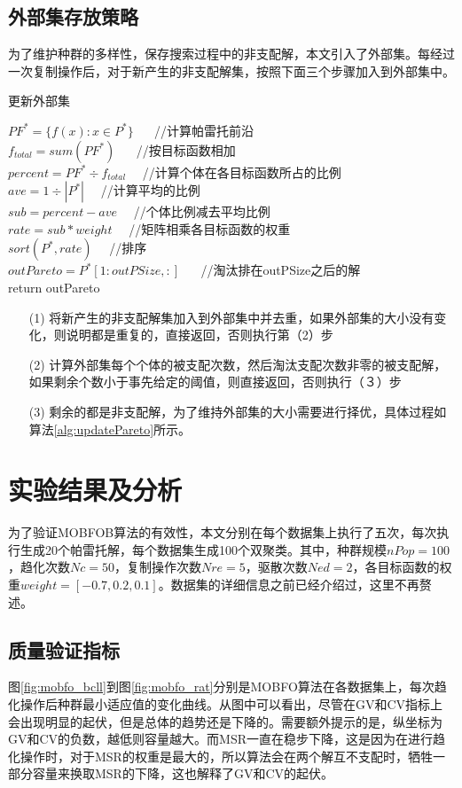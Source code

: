     \subsection{外部集存放策略}
    为了维护种群的多样性，保存搜索过程中的非支配解，本文引入了外部集。每经过一次复制操作后，对于新产生的非支配解集，按照下面三个步骤加入到外部集中。
    \begin{algorithm}[htbp]
        \caption{更新外部集} \label{alg:updatePareto}
        $PF^*= \{f(x):x\in P^*\}$ 　 //计算帕雷托前沿 \\
        $f_{total} = sum(PF^*)$  　 //按目标函数相加\\
        $percent = PF^* \div　f_{total} $　 //计算个体在各目标函数所占的比例\\
        $ave = 1 \div |P^*|$　 //计算平均的比例\\
        $sub = percent - ave$　 //个体比例减去平均比例 \\
        $rate = sub \ast weight$　 //矩阵相乘各目标函数的权重\\
        $sort(P^*, rate)$　 //排序\\
        $outPareto = P^*[1:outPSize,:]$ 　 //淘汰排在outPSize之后的解\\
        return outPareto
    \end{algorithm}
    \begin{enumerate}
       \item[(1)] 将新产生的非支配解集加入到外部集中并去重，如果外部集的大小没有变化，则说明都是重复的，直接返回，否则执行第（2）步
       \item[(2)] 计算外部集每个个体的被支配次数，然后淘汰支配次数非零的被支配解，如果剩余个数小于事先给定的阈值，则直接返回，否则执行（３）步
       \item[(3)] 剩余的都是非支配解，为了维持外部集的大小需要进行择优，具体过程如算法\ref{alg:updatePareto}所示。
    \end{enumerate} 
\section{实验结果及分析}
为了验证MOBFOB算法的有效性，本文分别在每个数据集上执行了五次，每次执行生成20个帕雷托解，每个数据集生成100个双聚类。其中，种群规模$nPop=100$，趋化次数$Nc=50$，复制操作次数$Nre=5$，驱散次数$Ned=2$，各目标函数的权重$weight = [-0.7, 0.2, 0.1]$。数据集的详细信息之前已经介绍过，这里不再赘述。

    \subsection{质量验证指标}
    图\ref{fig:mobfo_bcll}到图\ref{fig:mobfo_rat}分别是MOBFO算法在各数据集上，每次趋化操作后种群最小适应值的变化曲线。从图中可以看出，尽管在GV和CV指标上会出现明显的起伏，但是总体的趋势还是下降的。需要额外提示的是，纵坐标为GV和CV的负数，越低则容量越大。而MSR一直在稳步下降，这是因为在进行趋化操作时，对于MSR的权重是最大的，所以算法会在两个解互不支配时，牺牲一部分容量来换取MSR的下降，这也解释了GV和CV的起伏。

